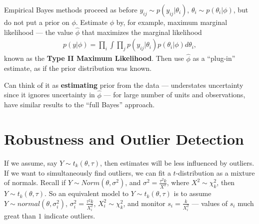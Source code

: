 \begin{defn}
  \label{sec:heirachcial-models-4}
  Empirical Bayes methods proceed as before $y_{ij} \sim p(y_{ij} |
  \theta_{i})$, $\theta_{i} \sim p(\theta_{i} | \phi)$, but do not put
  a prior on $\phi$.  Estimate $\phi$ by, for example, maximum
  marginal likelihood --- the value $\hat \phi$ that maximizes the
  marginal likelihood
  \begin{align}
    \label{eq:22}
    p(y | \phi) = \prod_{i} \int \prod_{j} p(y_{ij} | \theta_{i})
    p(\theta_{i} | \phi) d \theta_{i},
  \end{align}  known as the \textbf{Type II Maximum Likelihood}.  Then
  use $\hat \phi$ as a ``plug-in'' estimate, as if the prior
  distribution was known.

  Can think of it as \textbf{estimating} prior from the data ---
  understates uncertainty since it ignores uncertainty in $\hat \phi$
  --- for large number of units and observations, have similar results
  to the ``full Bayes'' approach.
\end{defn}


\section{Robustness and Outlier Detection}
\label{sec:robustn-outl-detect}

\begin{defn}
  \label{sec:robustn-outl-detect-1}
  If we assume, say $Y \sim t_{k}(\theta, \tau)$, then estimates will
  be less influenced by outliers.  If we want to simultaneously find
  outliers, we can fit a $t$-distribution as a mixture of normals.
  Recall if $Y \sim Norm(\theta, \sigma^{2})$, and $\sigma^{2} =
  \frac{\tau^{2} k}{X^{2}} $, where $X^{2} \sim \chi^{2}_{k}$, then $Y
  \sim t_{k}(\theta, \tau)$.    So an equivalent model to $Y \sim
  t_{k}(\theta, \tau)$ is to assume $Y \sim normal(\theta,
  \sigma_{i}^{2})$, $\sigma_{i}^{2} = \frac{\tau^{2} k }{X_{i}^{2}} $,
  $X_{i}^{2} \sim \chi^{2}_{k}$, and monitor $s_{i} =
  \frac{k}{X_{i}^{2}} $ --- values of $s_{i}$ much great than $1$
  indicate outliers.
\end{defn}






